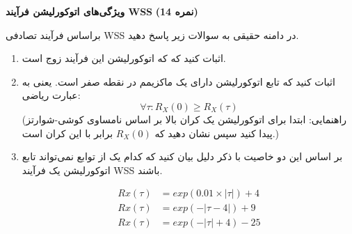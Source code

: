 \Large \textbf{ویژگی‌های اتوکورلیشن فرآیند WSS}
\large \textbf{(14 نمره)}

\normalsize \vspace{0.5cm}
براساس فرآیند تصادفی WSS در دامنه حقیقی به سوالات زیر پاسخ دهید.
\begin{enumerate}[label=(\alph*)]
	\item
اثبات کنید که که اتوکورلیشن این فرآیند زوج است.
	\item
اثبات کنید که تابع اتوکورلیشن دارای یک ماکزیمم در نقطه صفر است. یعنی به عبارت ریاضی:
$$
\forall \tau : R_{X}(0) \geqslant R_X(\tau)
$$
(راهنمایی: ابتدا برای اتوکورلیشن یک کران بالا بر اساس نامساوی کوشی-شوارتز پیدا کنید سپس نشان دهید که 
$ R_X(0) $
برابر با این کران است.)
	\item 
بر اساس این دو خاصیت با ذکر دلیل بیان کنید که کدام یک از توابع نمی‌تواند تابع اتوکورلیشن یک فرآیند WSS باشند.

\begin{align*}
	Rx(\tau) &= exp(0.01 \times |\tau|) + 4 \\
	Rx(\tau) &= exp(-|\tau - 4|) + 9  \\
	Rx(\tau) &= exp(-|\tau| + 4) - 25 
\end{align*}

\end{enumerate}


